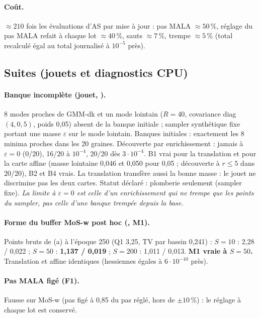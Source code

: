 \paragraph{Coût.} $\approx210$ fois les évaluations d'AS par mise à jour : pas MALA $\approx50\,\%$, réglage du pas MALA refait à chaque lot $\approx40\,\%$, sauts $\approx7\,\%$, trempe $\approx5\,\%$ (total recalculé égal au total journalisé à $10^{-5}$ près).

\subsection{Suites (jouets et diagnostics CPU)}
\paragraph{Banque incomplète (jouet, ).} 8 modes proches de GMM-dk et un mode lointain ($R=40$, covariance diag$(4,0{,}5)$, poids 0,05) absent de la banque initiale ; sampler synthétique fixe portant une masse $\varepsilon$ sur le mode lointain. Banques initiales : exactement les 8 minima proches dans les 20 graines. Découverte par enrichissement : jamais à $\varepsilon=0$ (0/20), 16/20 à $10^{-4}$, 20/20 dès $3\cdot10^{-4}$. B1 vrai pour la translation et pour la carte affine (masse lointaine 0,046 et 0,050 pour 0,05 ; découverte à $r\le5$ dans 20/20), B2 et B4 vrais. La translation transfère aussi la bonne masse : le jouet ne discrimine pas les deux cartes. Statut déclaré : plomberie seulement (sampler fixe). \emph{La limite à $\varepsilon=0$ est celle d'un enrichissement qui ne trempe que les points du sampler, pas celle d'une banque trempée depuis la base.}
\paragraph{Forme du buffer MoS-w post hoc (, M1).} Points bruts de (a) à l'époque 250 (Q1 3,25, TV par bassin 0,241) : $S=10$ : 2,28 / 0,022 ; $S=50$ : \textbf{1,137 / 0,019} ; $S=200$ : 1,011 / 0,013. \textbf{M1 vraie à $S=50$.} Translation et affine identiques (hessiennes égales à $6\cdot10^{-10}$ près).
\paragraph{Pas MALA figé (F1).} Fausse sur MoS-w (pas figé à 0,85 du pas réglé, hors de $\pm10\,\%$) : le réglage à chaque lot est conservé.
